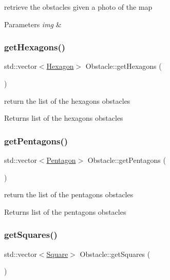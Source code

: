 retrieve the obstacles given a photo of the map 
\begin{DoxyParams}{Parameters}
{\em img} & \\
\hline
\end{DoxyParams}
\mbox{\label{class_obstacle_a472a93843d84f1275c5b9cd57aa53850}} 
\subsubsection{\texorpdfstring{get\+Hexagons()}{getHexagons()}}
{\footnotesize\ttfamily std\+::vector$<$\mbox{\hyperlink{class_hexagon}{Hexagon}}$>$ Obstacle\+::get\+Hexagons (\begin{DoxyParamCaption}{ }\end{DoxyParamCaption})}

return the list of the hexagons obstacles \begin{DoxyReturn}{Returns}
list of the hexagons obstacles 
\end{DoxyReturn}
\mbox{\label{class_obstacle_a2a3f85aa41ff39922c3994154fa8a7c1}} 
\subsubsection{\texorpdfstring{get\+Pentagons()}{getPentagons()}}
{\footnotesize\ttfamily std\+::vector$<$\mbox{\hyperlink{class_pentagon}{Pentagon}}$>$ Obstacle\+::get\+Pentagons (\begin{DoxyParamCaption}{ }\end{DoxyParamCaption})}

return the list of the pentagons obstacles \begin{DoxyReturn}{Returns}
list of the pentagons obstacles 
\end{DoxyReturn}
\mbox{\label{class_obstacle_a53daef38dbe68e85696abc8ed03cf4b2}} 
\subsubsection{\texorpdfstring{get\+Squares()}{getSquares()}}
{\footnotesize\ttfamily std\+::vector$<$\mbox{\hyperlink{class_square}{Square}}$>$ Obstacle\+::get\+Squares (\begin{DoxyParamCaption}{ }\end{DoxyParamCaption})}

